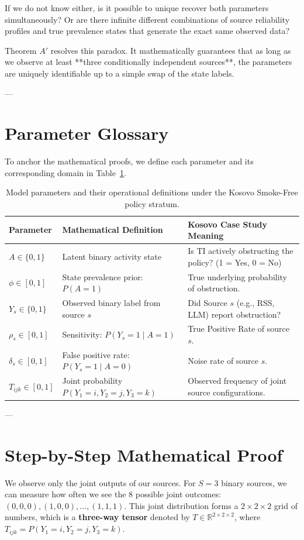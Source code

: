 \documentclass[11pt,a4paper]{article}
\begin{document}
If we do not know either, is it possible to unique recover both parameters simultaneously? Or are there infinite different combinations of source reliability profiles and true prevalence states that generate the exact same observed data?

Theorem $A'$ resolves this paradox. It mathematically guarantees that as long as we observe at least **three conditionally independent sources**, the parameters are uniquely identifiable up to a simple swap of the state labels.

---

\section{Parameter Glossary}
To anchor the mathematical proofs, we define each parameter and its corresponding domain in Table~\ref{tab:parameters}.

\begin{table}[h]
\centering
\caption{Model parameters and their operational definitions under the Kosovo Smoke-Free policy stratum.}
\label{tab:parameters}
\begin{tabularx}{\textwidth}{llX}
\toprule
\textbf{Parameter} & \textbf{Mathematical Definition} & \textbf{Kosovo Case Study Meaning} \\
\midrule
$A \in \{0, 1\}$ & Latent binary activity state & Is TI actively obstructing the policy? (1 = Yes, 0 = No) \\
$\phi \in [0, 1]$ & State prevalence prior: $P(A = 1)$ & True underlying probability of obstruction. \\
$Y_s \in \{0, 1\}$ & Observed binary label from source $s$ & Did Source $s$ (e.g., RSS, LLM) report obstruction? \\
$\rho_s \in [0, 1]$ & Sensitivity: $P(Y_s = 1 \mid A = 1)$ & True Positive Rate of source $s$. \\
$\delta_s \in [0, 1]$ & False positive rate: $P(Y_s = 1 \mid A = 0)$ & Noise rate of source $s$. \\
$T_{ijk} \in [0, 1]$ & Joint probability $P(Y_1=i, Y_2=j, Y_3=k)$ & Observed frequency of joint source configurations. \\
\bottomrule
\end{tabularx}
\end{table}

---

\section{Step-by-Step Mathematical Proof}
We observe only the joint outputs of our sources. For $S=3$ binary sources, we can measure how often we see the 8 possible joint outcomes: $(0,0,0), (1,0,0), \dots, (1,1,1)$. This joint distribution forms a $2 \times 2 \times 2$ grid of numbers, which is a \textbf{three-way tensor} denoted by $T \in \mathbb{R}^{2 \times 2 \times 2}$, where $T_{ijk} = P(Y_1=i, Y_2=j, Y_3=k)$.
\end{document}

